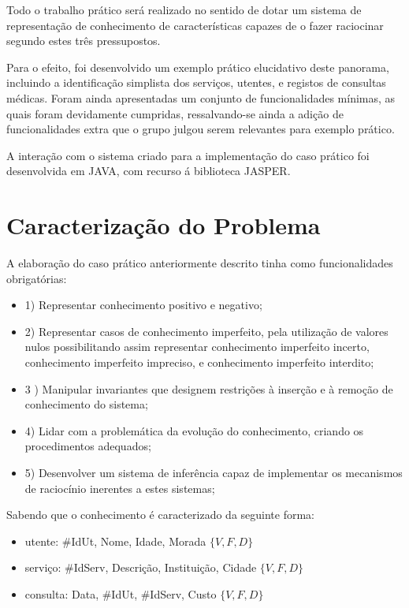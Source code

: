 \documentclass[
  oneside,
  10pt, a4paper,
  footinclude=true,
  headinclude=true,
  cleardoublepage=empty
]{scrbook}
\begin{document}
Todo o trabalho prático será realizado no sentido de dotar um sistema de representação de conhecimento de características capazes de o fazer raciocinar segundo estes três pressupostos.\par 

Para o efeito, foi desenvolvido um exemplo prático elucidativo deste panorama, incluindo a identificação simplista dos serviços, utentes, e registos de consultas médicas. Foram ainda apresentadas um conjunto de funcionalidades mínimas, as quais foram devidamente cumpridas, ressalvando-se ainda a adição de funcionalidades extra que o grupo julgou serem relevantes para exemplo prático.\par 
A interação com o sistema criado para a implementação do caso prático foi desenvolvida em JAVA, com recurso á biblioteca JASPER.


	\chapter{Caracterização do Problema}
	         A elaboração do caso prático anteriormente descrito tinha como funcionalidades obrigatórias:
	         
\label{objectivos}
\begin{itemize}
\item 1) Representar conhecimento positivo e negativo;
\item 2) Representar casos de conhecimento imperfeito, pela utilização de valores nulos possibilitando assim representar conhecimento imperfeito incerto, conhecimento imperfeito impreciso, e conhecimento imperfeito interdito;
\item 3 ) Manipular invariantes que designem restrições à inserção e à remoção de conhecimento do sistema;
\item 4) Lidar com a problemática da evolução do conhecimento, criando os procedimentos adequados;
\item 5) Desenvolver um sistema de inferência capaz de implementar os mecanismos de raciocínio inerentes a estes sistemas;
\end{itemize}
\vspace{1cm}

Sabendo que o conhecimento é caracterizado da seguinte forma:
\begin{itemize}
\item{utente: \#IdUt, Nome, Idade, Morada \rightarrow $\{V,F,D\}$
}

\item{serviço: \#IdServ, Descrição, Instituição, Cidade \rightarrow $\{V,F,D\}$
}

\item consulta: Data, \#IdUt, \#IdServ, Custo \rightarrow $\{V,F,D\}$

\end{itemize}
\vspace{1cm}
\end{document}
